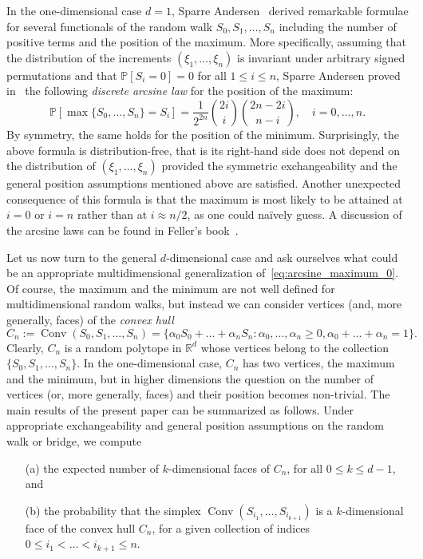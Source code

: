 \documentclass[12pt, reqno]{amsart}
\theoremstyle{plain}
\theoremstyle{definition}
\theoremstyle{remark}
\begin{document}
In the one-dimensional case $d=1$, Sparre Andersen~\cite{Sparre2, sparre_andersen1,sparre_andersen2} derived remarkable formulae for several functionals of the random walk $S_0,S_1,\ldots,S_n$ including the number of positive terms and the position of the maximum.
More specifically, assuming that the distribution of the increments $(\xi_1,\ldots,\xi_n)$ is invariant under arbitrary signed permutations and that ${\mathbb{P}}[S_i=0]=0$ for all $1\leq i\leq n$, Sparre Andersen proved in~\cite[Theorem~C]{sparre_andersen2} the following \emph{discrete arcsine law} for the position of the maximum:
\begin{equation}\label{eq:arcsine_maximum_0}
{\mathbb{P}}\left[\max\{S_0,\ldots,S_n\} = S_i\right] =
\frac 1 {2^{2n}} \binom{2i}{i} \binom{2n-2i}{n-i},
\quad
i=0,\ldots,n.
\end{equation}
By symmetry, the same holds for the position of the minimum. Surprisingly, the above formula is distribution-free, that is its right-hand side does not depend on the distribution of $(\xi_1,\ldots,\xi_n)$ provided the symmetric exchangeability and the general position assumptions mentioned above are satisfied. Another unexpected consequence of this formula is that the maximum is most likely to be attained at $i=0$ or $i=n$ rather than at $i\approx n/2$, as one could na\"{i}vely guess. A discussion of the arcsine laws can be found in Feller's book~\cite[Vol II, Section XII.8]{Feller}.

Let us now turn to the general $d$-dimensional case and ask ourselves what could be an appropriate multidimensional generalization of~\eqref{eq:arcsine_maximum_0}. Of course, the maximum and the minimum are not well defined for multidimensional random walks, but instead we can consider vertices (and, more generally, faces) of the \emph{convex hull} 
\begin{equation*}
C_n := {\mathop{\mathrm{Conv}}\nolimits}(S_0,S_1,\ldots, S_n)
=\{\alpha_0 S_0+\ldots+\alpha_n S_n \colon \alpha_0,\ldots,\alpha_n \geq 0, \alpha_0+\ldots+\alpha_n =1\}.
\end{equation*}
Clearly, $C_n$ is a random polytope in ${\mathbb{R}}^d$ whose vertices belong to the collection $\{S_0,S_1,\ldots,S_n\}$. In the one-dimensional case, $C_n$ has two vertices, the maximum and the minimum, but in higher dimensions the question on the number of vertices (or, more generally, faces) and their position becomes non-trivial.
The main results of the present paper can be summarized as follows.
Under appropriate exchangeability and general position assumptions on the random walk or bridge, we compute
\begin{enumerate}
\item [(a)] 
the expected number of $k$-dimensional faces of $C_n$, for all $0\leq k\leq d-1$, and
\item [(b)] 
the probability that the simplex ${\mathop{\mathrm{Conv}}\nolimits}(S_{i_1},\ldots,S_{i_{k+1}})$ is a $k$-dimensional face of the convex hull $C_n$, for a given collection of indices $0\leq i_1 < \ldots < i_{k+1}\leq n$.
\end{enumerate}
\end{document}

